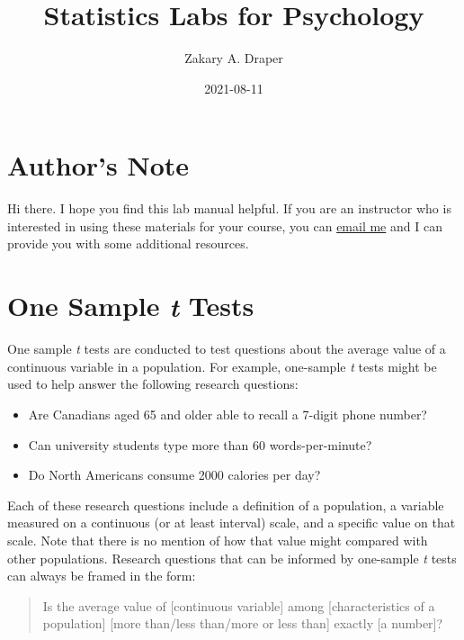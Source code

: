 \documentclass[
]{book}
\title{Statistics Labs for Psychology}
\author{Zakary A. Draper}
\date{2021-08-11}
\providecommand{\tightlist}{%
  \setlength{\itemsep}{0pt}\setlength{\parskip}{0pt}}
\begin{document}
\maketitle

{
\setcounter{tocdepth}{1}
\tableofcontents
}
\hypertarget{authors-note}{%
\chapter*{Author's Note}\label{authors-note}}

Hi there. I hope you find this lab manual helpful. If you are an instructor who is interested in using these materials for your course, you can \href{mailto:zakary.draper@ubc.ca}{email me} and I can provide you with some additional resources.

\hypertarget{ost}{%
\chapter{\texorpdfstring{One Sample \emph{t} Tests}{One Sample t Tests}}\label{ost}}

One sample \emph{t} tests are conducted to test questions about the average value of a continuous variable in a population. For example, one-sample \emph{t} tests might be used to help answer the following research questions:

\begin{itemize}
\tightlist
\item
  Are Canadians aged 65 and older able to recall a 7-digit phone number?
\item
  Can university students type more than 60 words-per-minute?
\item
  Do North Americans consume 2000 calories per day?
\end{itemize}

Each of these research questions include a definition of a population, a variable measured on a continuous (or at least interval) scale, and a specific value on that scale. Note that there is no mention of how that value might compared with other populations. Research questions that can be informed by one-sample \emph{t} tests can always be framed in the form:

\begin{quote}
Is the average value of {[}continuous variable{]} among {[}characteristics of a population{]} {[}more than/less than/more or less than{]} exactly {[}a number{]}?
\end{quote}
\end{document}
